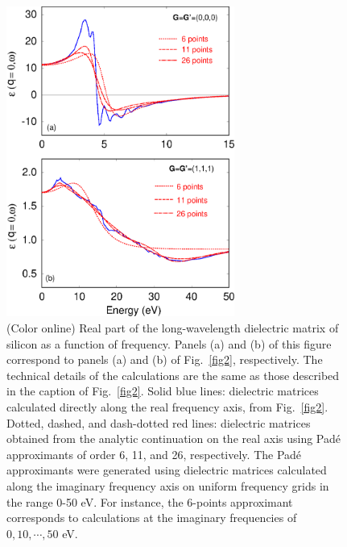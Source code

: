 \documentclass[twocolumn,prb,showpacs,superscriptaddress]{revtex4}
\begin{document}
\begin  {figure}
\begin  {center}
\includegraphics[width=7.5cm]{fig3.eps}
\end    {center}
\caption{\label{fig3}
        (Color online)
        Real part of the long-wavelength dielectric matrix of silicon as a function of frequency. 
        Panels (a) and (b) of this figure correspond to panels (a) and (b) of Fig.~\ref{fig2}, respectively. The 
        technical details of the calculations are the same as those described in the caption of Fig.\ \ref{fig2}.
        Solid blue lines: dielectric matrices calculated directly along the real frequency axis,
        from  Fig.\ \ref{fig2}. Dotted, dashed, and dash-dotted red lines: dielectric matrices
        obtained from the analytic continuation on the real axis using Pad\'e approximants of order
        6, 11, and 26, respectively. The Pad\'e approximants were generated using dielectric
        matrices calculated along the imaginary frequency axis on uniform frequency grids
        in the range 0-50 eV. For instance, the 6-points approximant corresponds to calculations
        at the imaginary frequencies of $0,10,\cdots,50$ eV.
        }
\end    {figure}
\end{document}
